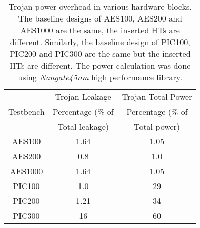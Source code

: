 \documentclass{beamer}
\begin{document}
\begin{columns}
\begin{column}[T]{0.33\textwidth}
                \begin{center}
                    \begin{table}[h]
                        \begin{center}
                            \begin{tabular}{c c c}
                                          & Trojan Leakage        & Trojan Total Power  \\
                                Testbench & Percentage (\% of     & Percentage (\% of \\
                                          & Total leakage)        & Total power) \\
                            \hline
                                AES100    & 1.64           & 1.05 \\
                                AES200    & 0.8            & 1.0 \\
                                AES1000   & 1.64           & 1.05 \\
                                PIC100    &1.0             & 29 \\
                                PIC200    & 1.21           & 34\\
                                PIC300    &16              & 60 \\
                            \end{tabular}
                            \caption{Trojan power overhead in various hardware
                            blocks. The baseline designs of AES100, AES200 and
                            AES1000 are the same, the inserted HTs are different.
                            Similarly, the baseline design of PIC100, PIC200 and
                            PIC300 are the same but the inserted HTs are different.
                            {\color{black}The power calculation was done using
                            \textit{Nangate45nm} high performance library.}}
                            \label{tab:power}
                        \end{center}
                    \end{table}
                \end{center}


\end{column}
\end{columns}
\end{document}
